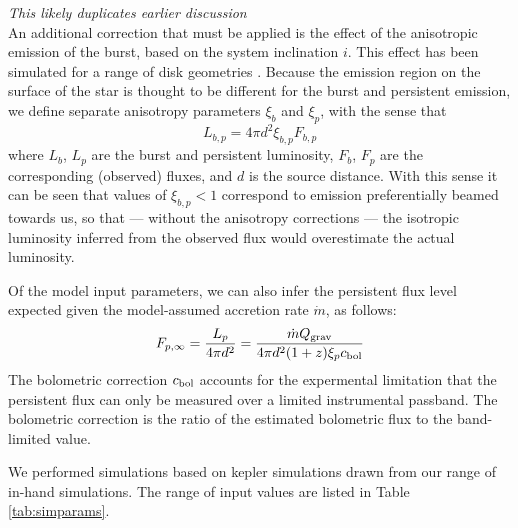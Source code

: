\documentclass{aastex63}
\begin{document}
{\it This likely duplicates earlier discussion} \\
%
An additional correction that must be applied is the effect of the anisotropic emission of the burst, based on the system inclination $i$. This effect has been simulated for a range of disk geometries \cite[e.g.][]{he16}. Because the emission region on the surface of the star is thought to be different for the burst and persistent emission, we define separate anisotropy parameters $\xi_b$ and $\xi_p$, with the sense that
\begin{equation}
L_{b,p} = 4\pi d^2\xi_{b,p}F_{b,p}
\end{equation}
where $L_b$, $L_p$ are the burst and persistent luminosity, $F_b$, $F_p$ are the corresponding (observed) fluxes, and $d$ is the source distance. With this sense it can be seen that values of $\xi_{b,p}<1$ correspond to emission preferentially beamed towards us, so that --- without the anisotropy corrections --- the isotropic luminosity inferred from the observed flux would overestimate the actual luminosity.

Of the model input parameters, we can also infer the persistent flux level expected given the model-assumed accretion rate $\dot{m}$, as follows: %
\begin{equation}
F_{p,\infty} = \frac{L_p}{4\pi d^2} = 
\frac{\dot{m} Q_{\rm grav}}{4\pi d^2 (1+z)\xi_p c_{\rm bol}}
\label{eq:fper}
\end{equation}
%
The bolometric correction $c_{\rm bol}$ accounts for the expermental limitation that the persistent flux can only be measured over a limited instrumental passband. The bolometric correction is the ratio of the estimated bolometric flux to the band-limited value.

We performed simulations based on {\sc kepler} simulations drawn from our range of in-hand simulations. The range of input values are listed in Table \ref{tab:simparams}.
\end{document}
